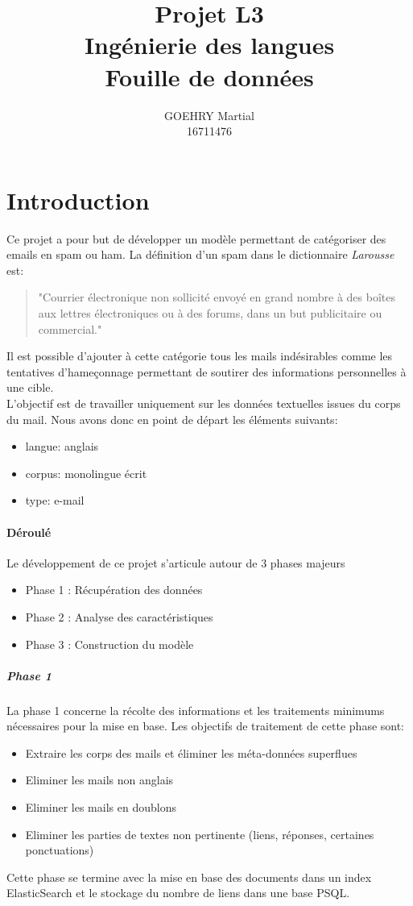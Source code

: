 \documentclass[a4paper,12pt]{article}
\title{Projet L3\\Ingénierie des langues\\Fouille de données}
\author{GOEHRY Martial\\16711476}
\begin{document}
	\maketitle
	\tableofcontents
	\newpage
	
\section{Introduction}
	Ce projet a pour but de développer un modèle permettant de catégoriser des emails en spam ou ham.
	La définition d'un spam dans le dictionnaire \emph{Larousse} est:
	
	\begin{quote}
	"Courrier électronique non sollicité envoyé en grand nombre à des boîtes aux lettres électroniques ou à des forums, dans un but publicitaire ou commercial."
	\end{quote}
	
	Il est possible d'ajouter à cette catégorie tous les mails indésirables comme les tentatives d'hameçonnage permettant de soutirer des informations personnelles à une cible.\\ 
	
	L'objectif est de travailler uniquement sur les données textuelles issues du corps du mail.
	Nous avons donc en point de départ les éléments suivants:
	\begin{itemize}
		\item langue: anglais
		\item corpus: monolingue écrit
		\item type: e-mail
	\end{itemize}
	
	\paragraph{Déroulé} Le développement de ce projet s'articule autour de 3 phases majeurs
		\begin{itemize}
			\item Phase 1 : Récupération des données
			\item Phase 2 : Analyse des caractéristiques
			\item Phase 3 : Construction du modèle
		\end{itemize}
		
	
	\subparagraph{Phase 1} La phase 1 concerne la récolte des informations et les traitements minimums nécessaires pour la mise en base. Les objectifs de traitement de cette phase sont:
	\begin{itemize}
		\item Extraire les corps des mails et éliminer les méta-données superflues
		\item Eliminer les mails non anglais
		\item Eliminer les mails en doublons
		\item Eliminer les parties de textes non pertinente (liens, réponses, certaines ponctuations)
	\end{itemize}
	Cette phase se termine avec la mise en base des documents dans un index ElasticSearch et le stockage du nombre de liens dans une base PSQL.
	
\end{document}
